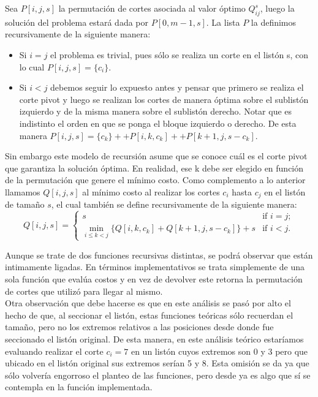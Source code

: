 \indent Sea $P[i,j,s]$ la permutación de cortes asociada al valor óptimo $Q^{s}_{ij}$, luego la solución del problema estará dada por $P[0,m-1,s]$. La lista $P$ la definimos recursivamente de la siguiente manera:
			\begin{itemize} \itemsep -2pt
			\item Si $i = j$ el problema es trivial, pues sólo se realiza un corte en el listón s, con lo cual $P[i,j,s] = \{c_i\}$.
			\end{itemize}
			\begin{itemize} \itemsep -2pt
			\item Si $i < j$ debemos seguir lo expuesto antes y pensar que primero se realiza el corte pivot y luego se realizan 				los cortes de manera óptima sobre el sublistón izquierdo y de la misma manera sobre el sublistón derecho. Notar que 				es indistinto el orden en que se ponga el bloque izquierdo o derecho. De esta manera $P[i,j,s] = \{c_k\} ++ P[i,k,c_k] 				++ P[k+1,j,s-c_k]$.
			\end{itemize}

Sin embargo este modelo de recursión asume que se conoce cuál es el corte pivot que garantiza la solución óptima. En realidad, ese k debe ser elegido en función de la permutación que genere el mínimo costo. Como complemento a lo anterior llamamos $Q[i,j,s]$ al mínimo costo al realizar los cortes $c_i$ hasta $c_j$ en el listón de tamaño $s$, el cual también se define recursivamente de la siguiente manera:
	\[ Q[i,j,s] = \left\{ \begin{array}{ll}
		 s & \mbox{if $i = j$};\\
		\min_{i \leq k < j} \{ Q[i,k,c_k] + Q[k+1,j,s-c_k] \} + s & \mbox{if $i < j$}.\end{array} \right. \] 

	
Aunque se trate de dos funciones recursivas distintas, se podrá observar que están intimamente ligadas. En términos implementativos se trata simplemente de una sola función que evalúa costos y en vez de devolver este retorna la permutación de cortes que utilizó para llegar al mismo.\\

\indent Otra observación que debe hacerse es que en este análisis se pasó por alto el hecho de que, al seccionar el listón, estas funciones teóricas sólo recuerdan el tamaño, pero no los extremos relativos a las posiciones desde donde fue seccionado el listón original. De esta manera, en este análisis teórico estaríamos evaluando realizar el corte $c_i = 7$ en un listón cuyos extremos son 0 y 3 pero que ubicado en el listón original sus extremos serían 5 y 8. Esta omisión se da ya que sólo volvería engorroso el planteo de las funciones, pero desde ya es algo que sí se contempla en la función implementada.

